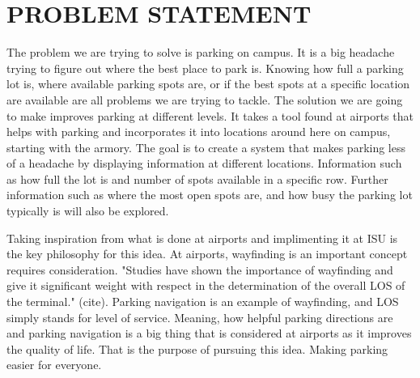 \documentclass[12pt]{article}
\begin{document}
\section{PROBLEM STATEMENT}
The problem we are trying to solve is parking on campus. It is a big headache trying to figure out where the best place to park is. Knowing how full a parking lot is, where available parking spots are, or if the best spots at a specific location are available are all problems we are trying to tackle. The solution we are going to make improves parking at different levels. It takes a tool found at airports that helps with parking and incorporates it into locations around here on campus, starting with the armory. The goal is to create a system that makes parking less of a headache by displaying information at different locations. Information such as how full the lot is and number of spots available in a specific row. Further information such as where the most open spots are, and how busy the parking lot typically is will also be explored. 

Taking inspiration from what is done at airports and implimenting it at ISU is the key philosophy for this idea. At airports, wayfinding is an important concept requires consideration. "Studies have shown the importance of wayfinding and give it significant weight with respect in the determination of the overall LOS of the terminal." (cite). Parking navigation is an example of wayfinding, and LOS simply stands for level of service. Meaning, how helpful parking directions are and parking navigation is a big thing that is considered at airports as it improves the quality of life. That is the purpose of pursuing this idea. Making parking easier for everyone. 
\end{document}
